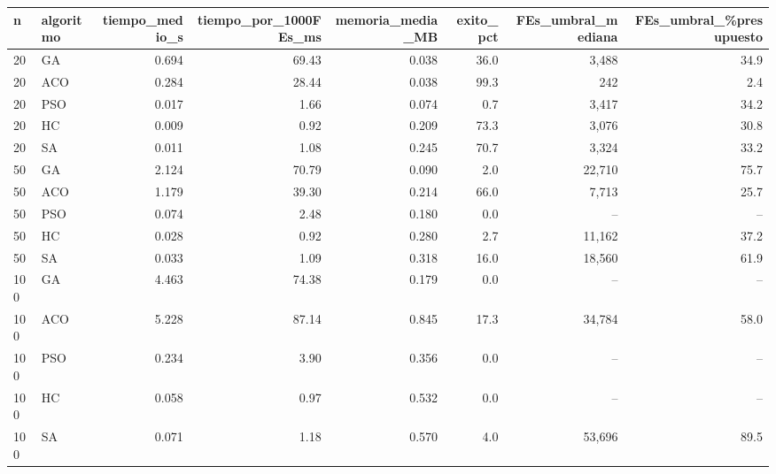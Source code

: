 \begin{tabular}{llrrrrrr}
\toprule
n & algoritmo & tiempo\_medio\_s & tiempo\_por\_1000FEs\_ms & memoria\_media\_MB & exito\_pct & FEs\_umbral\_mediana & FEs\_umbral\_\%presupuesto \\
\midrule
20 & GA & 0.694 & 69.43 & 0.038 & 36.0 & 3,488 & 34.9 \\
20 & ACO & 0.284 & 28.44 & 0.038 & 99.3 & 242 & 2.4 \\
20 & PSO & 0.017 & 1.66 & 0.074 & 0.7 & 3,417 & 34.2 \\
20 & HC & 0.009 & 0.92 & 0.209 & 73.3 & 3,076 & 30.8 \\
20 & SA & 0.011 & 1.08 & 0.245 & 70.7 & 3,324 & 33.2 \\
\midrule
50 & GA & 2.124 & 70.79 & 0.090 & 2.0 & 22,710 & 75.7 \\
50 & ACO & 1.179 & 39.30 & 0.214 & 66.0 & 7,713 & 25.7 \\
50 & PSO & 0.074 & 2.48 & 0.180 & 0.0 & -- & -- \\
50 & HC & 0.028 & 0.92 & 0.280 & 2.7 & 11,162 & 37.2 \\
50 & SA & 0.033 & 1.09 & 0.318 & 16.0 & 18,560 & 61.9 \\
\midrule
100 & GA & 4.463 & 74.38 & 0.179 & 0.0 & -- & -- \\
100 & ACO & 5.228 & 87.14 & 0.845 & 17.3 & 34,784 & 58.0 \\
100 & PSO & 0.234 & 3.90 & 0.356 & 0.0 & -- & -- \\
100 & HC & 0.058 & 0.97 & 0.532 & 0.0 & -- & -- \\
100 & SA & 0.071 & 1.18 & 0.570 & 4.0 & 53,696 & 89.5 \\
\bottomrule
\end{tabular}
